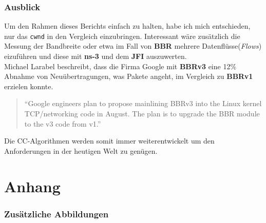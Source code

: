 \documentclass[paper=a4,fontsize=12pt,ngerman]{scrartcl}
\begin{document}
\section{Ausblick}
Um den Rahmen dieses Berichts einfach zu halten, habe ich mich entschieden, nur das \texttt{cwnd} in den Vergleich 
einzubringen. Interessant wäre zusätzlich die Messung der Bandbreite oder etwa im Fall von \textbf{BBR} mehrere Datenflüsse(\textit{Flows}) 
eizuführen und diese mit \textbf{ns-3} und dem \textbf{JFI} auszuwerten. \\
Michael Larabel beschreibt, dass die Firma Google mit \textbf{BBRv3} eine 12\% Abnahme von Neuübertragungen, was Pakete angeht,
im Vergleich zu \textbf{BBRv1} erzielen konnte.\cite{larabelBBR}

\begin{quote}
    ``Google engineers plan to propose mainlining BBRv3 into the Linux kernel TCP/networking code in August. 
    The plan is to upgrade the BBR module to the v3 code from v1.'' \cite{larabelBBR}
\end{quote}

Die CC-Algorithmen werden somit immer weiterentwickelt um den Anforderungen in der heutigen Welt zu genügen.



\clearpage
\renewcommand\refname{Literaturverzeichnis}





\clearpage
\appendix
\part*{Anhang}


\section{Zusätzliche Abbildungen}
\end{document}
